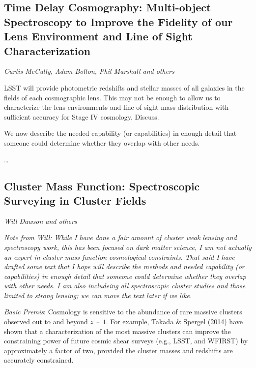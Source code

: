 
\subsection{Time Delay Cosmography: Multi-object Spectroscopy to Improve the Fidelity of our Lens Environment and Line of Sight Characterization}
{\it Curtis McCully, Adam Bolton, Phil Marshall and others}

LSST will provide photometric redshifts and stellar masses of all
galaxies in the fields of each cosmographic lens. This may not be enough
to allow us to characterize the lens environments and line of sight mass
distribution with sufficient accuracy for Stage IV cosmology. Discuss.

We now describe the needed capability (or capabilities) in enough detail
that someone could determine whether they overlap with other needs.

\ldots


\subsection{Cluster Mass Function: Spectroscopic Surveying in Cluster Fields}
\label{sec:sl:clusters}
{\it Will Dawson and others}

{\it Note from Will: While I have done a fair amount of cluster weak lensing and
spectroscopy work, this has been focused on dark matter science, I am not
actually an expert in cluster mass function cosmological constraints. That said
I have drafted some text that I hope will describe the methods and needed
capability (or capabilities) in enough detail that someone could determine
whether they overlap with other needs. I am also includeing all spectroscopic
cluster studies and those limited to strong lensing; we can move the text later
if we like.}

{\it Basic Premis}: Cosmology is sensitive to the abundance of rare massive
clusters observed out to and beyond $z\sim 1$. For example, Takada \& Spergel
(2014) have shown that a characterization of the most massive clusters can
improve the constraining power of future cosmic shear surveys (e.g., LSST, and
WFIRST) by approximately a factor of two, provided the cluster masses and
redshifts are accurately constrained.


